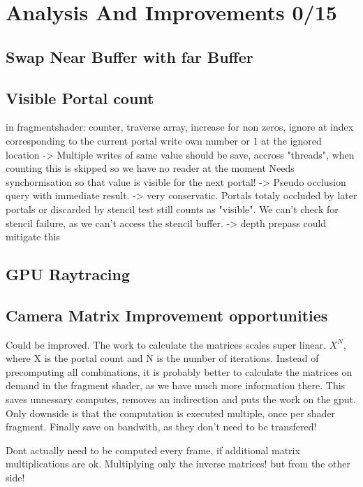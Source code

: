\section{Analysis And Improvements 0/15}

\subsection{Swap Near Buffer with far Buffer}


\subsection{Visible Portal count}

in fragmentshader: counter, traverse array, increase for non zeros, ignore at index corresponding to the current portal
write own number or 1 at the ignored location -> Multiple writes of same value should be save, accross "threads", when counting this is skipped so we have no reader at the moment
Needs synchornisation so that value is visible for the next portal!
-> Pseudo occlusion query with immediate result.
-> very conservatic. Portals totaly occluded by later portals or discarded by stencil test still counts as "visible". We can't check for stencil failure, as we can't access the stencil buffer.
-> depth prepass could mitigate this

\subsection{GPU Raytracing}

\subsection{Camera Matrix Improvement opportunities}
Could be improved. The work to calculate the matrices scales super linear. $X^{N}$, where X is the portal count and N is the number of iterations.
Instead of precomputing all combinations, it is probably better to calculate the matrices on demand in the fragment shader, as we have much more information there. This saves unnessary computes, removes an indirection and puts the work on the gput. Only downside is that the computation is executed multiple, once per shader fragment. Finally save on bandwith, as they don't need to be transfered!


Dont actually need to be computed every frame, if additional matrix multiplications are ok.
Multiplying only the inverse matrices! but from the other side!


